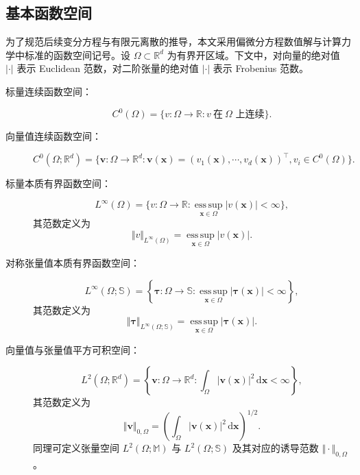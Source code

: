 \subsection{基本函数空间}
\label{subsec:function_spaces}

为了规范后续变分方程与有限元离散的推导，本文采用偏微分方程数值解与计算力学中标准的函数空间记号。设 $\Omega\subset\mathbb{R}^d$ 为有界开区域。下文中，对向量的绝对值 $\vert\cdot\vert$ 表示 Euclidean 范数，对二阶张量的绝对值 $\vert\cdot\vert$ 表示 Frobenius 范数。






\begin{description}
	\item[标量连续函数空间：] 
	\[
	C^0(\Omega) = \{v:\Omega\to\mathbb{R} : v~\text{在}~\Omega\text{ 上连续}\}.
	\]
	
	\item[向量值连续函数空间：]
	\[
	C^0(\Omega;\mathbb{R}^d) = \{\boldsymbol{v}:\Omega\to\mathbb{R}^d : \boldsymbol{v}(\boldsymbol{x}) = (v_1(\boldsymbol{x}),\cdots,v_d(\boldsymbol{x}))^{\top}, v_i\in C^0(\Omega)\}.
	\] 
	
	\item[标量本质有界函数空间：] 
	\[
	L^{\infty}(\Omega) = \{v:\Omega\to\mathbb{R} : \operatorname*{ess\,sup}_{\boldsymbol{x}\in\Omega}\vert v(\boldsymbol{x})\vert < \infty\},
	\]
	其范数定义为 
	\[
	\Vert v\Vert_{L^\infty(\Omega)} = \operatorname*{ess\,sup}_{\boldsymbol{x}\in\Omega}\vert v(\boldsymbol{x})\vert.
	\]
	
	\item[对称张量值本质有界函数空间：] 
	\[
	L^{\infty}(\Omega;\mathbb{S}) = \left\{\boldsymbol{\tau}:\Omega\to\mathbb{S} : \operatorname*{ess\,sup}_{\boldsymbol{x}\in\Omega}\vert\boldsymbol{\tau}(\boldsymbol{x})\vert <\infty \right\},
	\]
	其范数定义为
	\[
	\Vert\boldsymbol{\tau}\Vert_{L^\infty(\Omega;\mathbb{S})} = \operatorname*{ess\,sup}_{\boldsymbol{x}\in\Omega}\vert\boldsymbol{\tau}(\boldsymbol{x})\vert.
	\]
	
	\item[向量值与张量值平方可积空间：] 
	\[
	L^2(\Omega;\mathbb{R}^d) = \left\{\boldsymbol{v}:\Omega\to\mathbb{R}^d : \int_{\Omega} \vert\boldsymbol{v}(\boldsymbol{x})\vert^2 \,\mathrm{d}\boldsymbol{x} < \infty\right\},
	\]
	其范数定义为 
	\[
	\Vert\boldsymbol{v}\Vert_{0,\Omega} = \left(\int_{\Omega}|\boldsymbol{v}(\boldsymbol{x})|^2\,\mathrm{d}\boldsymbol{x}\right)^{1/2}.
	\]
	同理可定义张量空间 $L^2(\Omega;\mathbb{M})$ 与 $L^2(\Omega;\mathbb{S})$ 及其对应的诱导范数 $\Vert\cdot\Vert_{0,\Omega}$。
	

\end{description}
